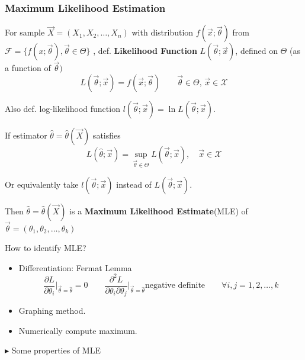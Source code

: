 \documentclass[11pt,a4paper]{ctexart}
\numberwithin{equation}{section}%
\newenvironment{point}{\raggedright$\blacktriangleright$}{}%
\begin{document}
\subsubsection{Maximum Likelihood Estimation}\label{SubSectionMLE}
    For sample $\vec{X}=(X_1,X_2,\ldots,X_n)$ with distribution $f(\vec{x};\vec{\theta})$ from $\mathscr{F}=\{f(x;\vec{\theta}),\vec{\theta}\in\Theta\}$ , def. \textbf{Likelihood Function} $L(\vec{\theta};\vec{x})$, defined on $\Theta$ (as a function of $\vec{\theta})$
    \[
        L(\vec{\theta};\vec{x})=f(\vec{x};\vec{\theta})\qquad \vec{\theta}\in\Theta,\,\vec{x}\in\mathscr{X}    
    \]

    Also def. log-likelihood function $l(\vec{\theta};\vec{x})=\ln L(\vec{\theta};\vec{x})$.

    If estimator $\hat{\theta}=\hat{\theta}(\vec{X})$ satisfies
    \[
        L(\hat{\theta};\vec{x})=\sup_{\vec{\theta}\in\Theta}L(\vec{\theta};\vec{x}),\quad \vec{x}\in\mathscr{X}
    \]

    Or equivalently take $l(\vec{\theta};\vec{x})$ instead of $L(\vec{\theta};\vec{x})$.

    Then $\hat{\theta}=\hat{\theta}(\vec{X})$ is a \textbf{Maximum Likelihood Estimate}(MLE) of $\vec{\theta}=(\theta_1,\theta_2,\ldots,\theta_k)$

    How to identify MLE?
    \begin{itemize}
        \item Differentiation: Fermat Lemma
        \[
            \frac{\partial L}{\partial \theta_i}\bigg|_{\vec{\theta}=\hat{\theta}}=0\qquad \frac{\partial^2 L}{\partial \theta_i \partial \theta_j}\bigg|_{\vec{\theta}=\hat{\theta}}\text{negative definite}\qquad \forall i,j=1,2,\ldots,k
        \]
        \item Graphing method.
        \item Numerically compute maximum.
    \end{itemize}

    \begin{point}
        Some properties of MLE
    \end{point}
    
\end{document}
